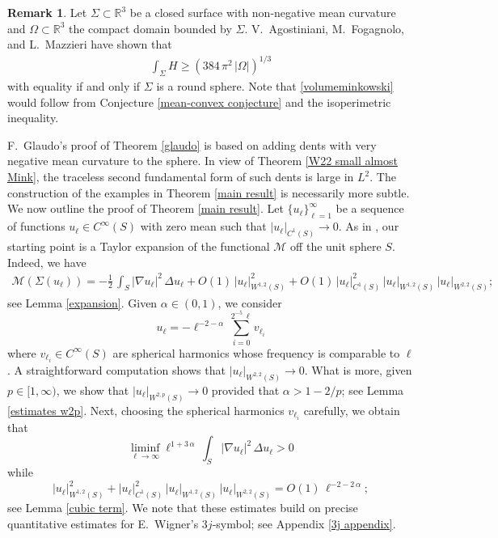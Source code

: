 \documentclass[11pt]{amsart}
\theoremstyle {definition}
\newtheorem{remark}[theorem]{Remark}
\begin{document}
\begin{remark} Let $\Sigma\subset \mathbb{R}^3$ be a closed surface with non-negative mean curvature and  $\Omega\subset\mathbb{R}^3$  the compact domain bounded by $\Sigma$. V.~Agostiniani, M.~Fogagnolo, and L.~Mazzieri \cite[Theorem 1.5]{AgostinianiFogagnoloMazzieri} have shown that \begin{align} \label{volumeminkowski} \int_{\Sigma} H\geq (384\,\pi^2\,|\Omega|)^{1/3}
	\end{align}
with equality if and only if $\Sigma$ is a round sphere.    Note that \eqref{volumeminkowski} would follow from Conjecture \ref{mean-convex conjecture} and the isoperimetric inequality.  
\end{remark} 
F.~Glaudo's proof of Theorem \ref{glaudo} is based on adding dents with very negative mean curvature to the sphere. In view of Theorem \ref{W22 small almost Mink}, the traceless second fundamental form of such dents is large in $L^2$. The construction of the examples in Theorem \ref{main result} is necessarily more subtle. \\ \indent  
We now outline the proof of Theorem \ref{main result}. Let $\{u_\ell\}_{\ell=1}^\infty$ be a sequence of functions $u_\ell\in C^\infty(S)$ with zero mean such that $|u_\ell|_{C^1(S)}\to0$. As in \cite[Appendix A]{Glaudo}, our starting point is a Taylor expansion of the functional $\mathcal{M}$ off the unit sphere $S$. Indeed, we have 
\begin{align*}%
\mathcal{M}(\Sigma(u_\ell))=-\frac12\,\int_S |\nabla u_\ell|^2\,\Delta u_\ell+O(1)\,|u_\ell|^2_{W^{1,2}(S)}+O(1)\,|u_\ell|^2_{C^1(S)}\,|u_\ell|_{W^{1,2}(S)}\,|u_\ell|_{W^{2,2}(S)};\end{align*}
see Lemma \ref{expansion}.  Given $\alpha\in(0,1)$, we consider 
$$
u_\ell=-\ell^{-2-\alpha}\,\sum_{i=0}^{2^{-5}\,\ell}v_{\ell_i}
$$
where $v_{\ell_i}\in C^\infty(S)$ are spherical harmonics whose frequency is comparable to $\ell$. A straightforward computation shows that  $|u_\ell|_{W^{2,2}(S)}\to 0$. What is more, given $p\in[1,\infty)$, we show that $|u_\ell|_{W^{2,p}(S)}\to 0$ provided that $\alpha>1-2/p$; see Lemma \ref{estimates w2p}. Next, choosing the spherical harmonics $v_{\ell_i}$ carefully, we obtain that
$$
\liminf_{\ell\to\infty}\ell^{1+3\,\alpha}\, \int_S |\nabla u_\ell|^2\,\Delta u_\ell>0
$$
while 
$$
|u_\ell|^2_{W^{1,2}(S)}+|u_\ell|^2_{C^1(S)}\,|u_\ell|_{W^{1,2}(S)}\,|u_\ell|_{W^{2,2}(S)}=O(1)\,\ell^{-2-2\,\alpha};
$$ 
see Lemma \ref{cubic term}. We note that these estimates build on precise quantitative estimates for E.~Wigner's $3j$-symbol; see Appendix \ref{3j appendix}.
\end{document}
